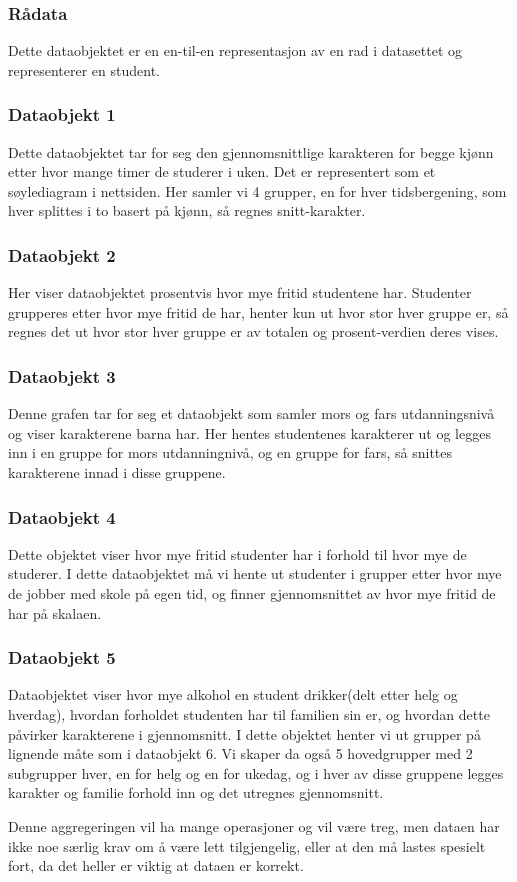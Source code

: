 \subsubsection{Rådata}
Dette dataobjektet er en en-til-en representasjon av en rad i datasettet og representerer en student.

\subsubsection{Dataobjekt 1}
Dette dataobjektet tar for seg den gjennomsnittlige karakteren for begge kjønn etter hvor mange timer de studerer i uken. Det er representert som et søylediagram i nettsiden. Her samler vi 4 grupper, en for hver tidsbergening, som hver splittes i to basert på kjønn, så regnes snitt-karakter.

\subsubsection{Dataobjekt 2}
Her viser dataobjektet prosentvis hvor mye fritid studentene har. Studenter grupperes etter hvor mye fritid de har, henter kun ut hvor stor hver gruppe er, så regnes 
det ut hvor stor hver gruppe er av totalen og prosent-verdien deres vises.

\subsubsection{Dataobjekt 3}
Denne grafen tar for seg et dataobjekt som samler mors og fars utdanningsnivå og viser karakterene barna har. Her hentes studentenes karakterer ut og legges inn i en gruppe for mors utdanningnivå, og en gruppe for fars, så snittes karakterene innad i disse gruppene.

\subsubsection{Dataobjekt 4}
Dette objektet viser hvor mye fritid studenter har i forhold til hvor mye de studerer. I dette dataobjektet må vi hente ut studenter i grupper etter hvor mye de jobber med skole på egen tid, og finner gjennomsnittet av hvor mye fritid de har på skalaen.

\subsubsection{Dataobjekt 5}
Dataobjektet viser hvor mye alkohol en student drikker(delt etter helg og hverdag), hvordan forholdet studenten har til familien sin er, og hvordan dette påvirker karakterene i gjennomsnitt. I dette objektet henter vi ut grupper på lignende måte som i dataobjekt 6. Vi skaper da også 5 hovedgrupper med 2 subgrupper hver, en for helg og en for ukedag, og i hver av disse gruppene legges karakter og familie forhold inn og det utregnes gjennomsnitt. 

Denne aggregeringen vil ha mange operasjoner og vil være treg, men dataen har ikke noe særlig krav om å være lett tilgjengelig, eller at den må lastes spesielt fort, da det heller er viktig at dataen er korrekt.

